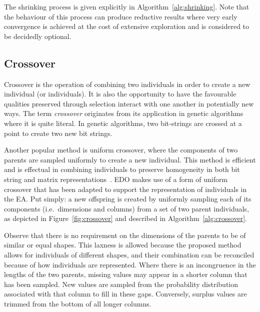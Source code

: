 The shrinking process is given explicitly in
Algorithm~\ref{alg:shrinking}. Note that the behaviour of this process can
produce reductive results where very early convergence is achieved at the cost
of extensive exploration and is considered to be decidedly optional.



\subsection{Crossover}

Crossover is the operation of combining two individuals in order to create a new
individual (or individuals). It is also the opportunity to have the favourable
qualities preserved through selection interact with one another in potentially
new ways. The term \emph{crossover} originates from its application in genetic
algorithms where it is quite literal. In genetic algorithms, two bit-strings are
crossed at a point to create two new bit strings.

Another popular method is uniform crossover, where the components of two parents
are sampled uniformly to create a new individual. This method is efficient and
is effectual in combining individuals to preserve homogeneity in both bit string
and matrix representations~\cite{Chen2018synthetic,Semenkin2012}. EDO makes use
of a form of uniform crossover that has been adapted to support the
representation of individuals in the EA. Put simply: a new offspring is created
by uniformly sampling each of its components (i.e.\ dimensions and columns) from
a set of two parent individuals, as depicted in Figure~\ref{fig:crossover} and
described in Algorithm~\ref{alg:crossover}.


Observe that there is no requirement on the dimensions of the parents to be of
similar or equal shapes. This laxness is allowed because the proposed method
allows for individuals of different shapes, and their combination can be
reconciled because of how individuals are represented. Where there is an
incongruence in the lengths of the two parents, missing values may appear in a
shorter column that has been sampled. New values are sampled from the
probability distribution associated with that column to fill in these gaps.
Conversely, surplus values are trimmed from the bottom of all longer columns.



